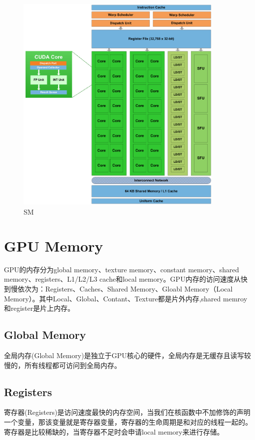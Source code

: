 \documentclass[12pt]{book}
\begin{document}
\begin{figure}[H]
	\centering
	\includegraphics[width=0.9\textwidth]{images/cuda-one-sm.png}
	\caption{SM}
	\label{SM}
\end{figure}

\section{GPU Memory}
GPU的内存分为global memory、texture memory、constant memory、shared memory、registers、L1/L2/L3 cache和local memory。GPU内存的访问速度从快到慢依次为：Registers、Caches、Shared Memory、Gloabl Memory（Local Memory）。其中Local、Global、Contant、Texture都是片外内存,shared memroy和register是片上内存。
\subsection{Global Memory}
全局内存(Global Memory)是独立于GPU核心的硬件，全局内存是无缓存且读写较慢的，所有线程都可访问到全局内存。

\subsection{Registers}
寄存器(Registers)是访问速度最快的内存空间，当我们在核函数中不加修饰的声明一个变量，那该变量就是寄存器变量，寄存器的生命周期是和对应的线程一起的。寄存器是比较稀缺的，当寄存器不足时会申请local memory来进行存储。
\end{document}
